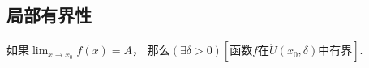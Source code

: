 \subsection{局部有界性}
\begin{corollary}[局部有界性]\label{theorem:极限.函数极限的局部有界性}
如果\(\lim_{x \to x_0} f(x) = A\)，
那么\((\exists\delta>0)[\text{函数$f$在$\mathring{U}(x_0,\delta)$中有界}]\).
\end{corollary}
